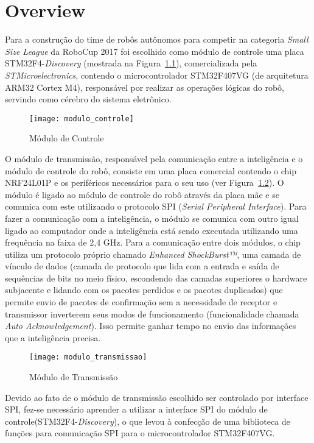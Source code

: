 \chapter{Overview}\label{cap:overview}

Para a construção do time de robôs autônomos para competir na categoria \textit{Small Size League}  da RoboCup 2017 foi escolhido como módulo de controle uma placa STM32F4-\textit{Discovery} (mostrada na Figura~\ref{fig:modulo_controle}), comercializada pela \textit{STMicroelectronics}, contendo o microcontrolador STM32F407VG (de arquitetura ARM32 Cortex M4), responsável por realizar as operações lógicas do robô, servindo como cérebro do sistema eletrônico.

\begin{figure}[H]
  \centering
  \texttt{[image: modulo\_controle]}
  \caption{Módulo de Controle}\label{fig:modulo_controle}
\end{figure}

O módulo de transmissão, responsável pela comunicação entre a inteligência e o módulo de controle do robô, consiste em uma placa comercial contendo o chip NRF24L01P e os periféricos necessários para o seu uso (ver Figura~\ref{fig:modulo_transmissao}). O módulo é ligado ao módulo de controle do robô através da placa mãe e se comunica com este utilizando o protocolo SPI (\textit{Serial Peripheral Interface}). Para fazer a comunicação com a inteligência, o módulo se comunica com outro igual ligado ao computador onde a inteligência está sendo executada utilizando uma frequência na faixa de 2,4 GHz. Para a comunicação entre dois módulos, o chip utiliza um protocolo próprio chamado \textit{Enhanced ShockBurst™}, uma camada de vínculo de dados (camada de protocolo que lida com a entrada e saída de sequências de bits no meio físico, escondendo das camadas superiores o hardware subjacente e lidando com os pacotes perdidos e os pacotes duplicados) que permite envio de pacotes de confirmação sem a necessidade de receptor e transmissor inverterem seus modos de funcionamento (funcionalidade chamada \textit{Auto Acknowledgement}).
Isso permite ganhar tempo no envio das informações que a inteligência precisa.

\begin{figure}[H]
  \centering
  \texttt{[image: modulo\_transmissao]}
  \caption{Módulo de Transmissão}\label{fig:modulo_transmissao}
\end{figure}

Devido ao fato de o módulo de transmissão escolhido ser controlado por interface SPI, fez-se necessário aprender a utilizar a interface SPI do módulo de controle(STM32F4-\textit{Discovery}), o que levou à confecção de uma  biblioteca de funções para comunicação SPI para o microcontrolador STM32F407VG.


